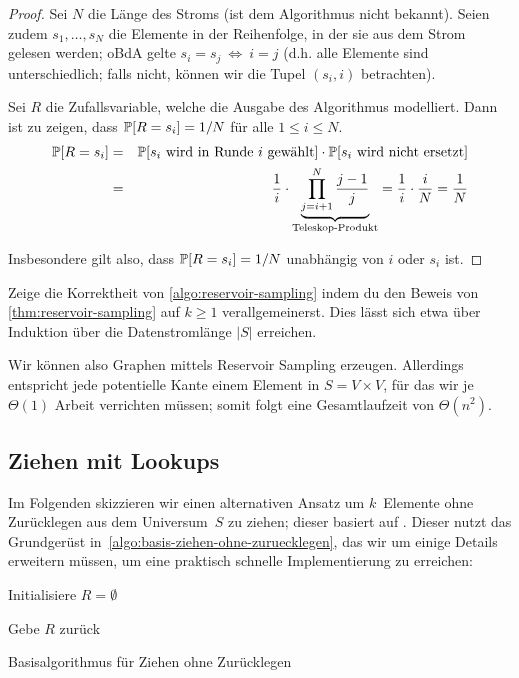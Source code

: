 \begin{proof}
    Sei $N$ die Länge des Stroms (ist dem Algorithmus nicht bekannt).
    Seien zudem $s_1, \ldots, s_N$ die Elemente in der Reihenfolge, in der sie aus dem Strom gelesen werden;
    oBdA gelte $s_i = s_j \ \Leftrightarrow\ i = j$ (d.h. alle Elemente sind unterschiedlich; falls nicht, können wir die Tupel $(s_i, i)$ betrachten).

    Sei $R$ die Zufallsvariable, welche die Ausgabe des Algorithmus modelliert.
    Dann ist zu zeigen, dass $\mathbb{P}\!\left[R = s_i\right] = 1 / N$ für alle $1 \le i \le N$.
    \begin{eqnarray}
        \mathbb{P}\!\left[R = s_i\right] &=& \mathbb{P}\!\left[\text{$s_i$ wird in Runde~$i$ gewählt}\right] \cdot \mathbb{P}\!\left[\text{$s_i$ wird nicht ersetzt}\right] \\
        &=& \frac{1}{i} \cdot \underbrace{\prod_{j=i+1}^N \frac{j-1}{j}}_{\text{Teleskop-Produkt}}
        = \frac{1}{i} \cdot \frac{i}{N} = \frac{1}{N}
    \end{eqnarray}

    \noindent Insbesondere gilt also, dass $\mathbb{P}\!\left[R = s_i\right] = 1/N$ unabhängig von $i$ oder $s_i$ ist.
\end{proof}

\begin{exercise}
    Zeige die Korrektheit von \cref{algo:reservoir-sampling} indem du den Beweis von \cref{thm:reservoir-sampling} auf $k \ge 1$ verallgemeinerst.
    Dies lässt sich etwa über Induktion über die Datenstromlänge $|S|$ erreichen.
\end{exercise}

Wir können also \Gnm Graphen mittels Reservoir Sampling erzeugen.
Allerdings entspricht jede potentielle Kante einem Element in $S = V \times V$, für das wir je $\Theta(1)$ Arbeit verrichten müssen;
somit folgt eine Gesamtlaufzeit von $\Theta(n^2)$.

\subsection{Ziehen mit Lookups}
Im Folgenden skizzieren wir einen alternativen Ansatz um $k$~Elemente ohne Zurücklegen aus dem Universum~$S$ zu ziehen; dieser basiert auf \cite{batagelj2005efficient}.
Dieser nutzt das Grundgerüst in~\cref{algo:basis-ziehen-ohne-zuruecklegen}, das wir um einige Details erweitern müssen, um eine praktisch schnelle Implementierung zu erreichen:

\begin{algorithm}[H]

    Initialisiere $R = \emptyset$\;


    Gebe $R$ zurück

    \caption{Basisalgorithmus für Ziehen ohne Zurücklegen}
    \label{algo:basis-ziehen-ohne-zuruecklegen}
\end{algorithm}

